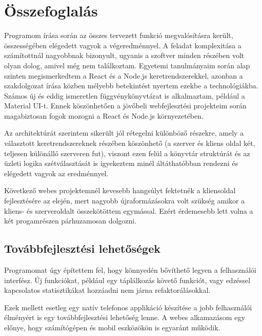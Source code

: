 \chapter{Összefoglalás}
\label{ch:osszefoglalas}

Programom írása során az összes tervezett funkció megvalósításra került, összességében elégedett vagyok a végeredménnyel. A feladat komplexitása a számítottnál nagyobbnak bizonyult, ugyanis a szoftver minden részében volt olyan dolog, amivel még nem találkoztam. Egyetemi tanulmányaim során alap szinten megismerkedtem a React és a Node.js keretrendszerekkel, azonban a szakdolgozat írása közben mélyebb betekintést nyertem ezekbe a technológiákba. Számos új és eddig ismeretlen függvénykönyvtárat is alkalmaztam, például a Material UI-t. Ennek köszönhetően a jövőbeli webfejlesztési projekteim során magabiztosan fogok mozogni a React és Node.js környezetében.



\bigskip

Az architektúrát szerintem sikerült jól rétegelni különböző részekre, amely a választott keretrendszereknek részében köszönhető (a szerver és kliens oldal két, teljesen különálló szerveren fut), viszont ezen felül a könyvtár struktúrát és az üzleti logika szétválasztását is igyekeztem minél áltáthatóbban rendezni és elégedett vagyok az eredménnyel.

\bigskip

Következő webes projektemnél kevesebb hangsúlyt fektetnék a kliensoldal fejlesztésére az elején, mert nagyobb újraformázásokra volt szükség amikor a kliens- és szerveroldalt összekötöttem egymással. Ezért érdemesebb lett volna a két progamrészen párhuzamosan dolgozni.

\pagebreak

\section{Továbbfejlesztési lehetőségek}

Programomat úgy építettem fel, hogy könnyedén bővíthető legyen a felhasználói interfész. Új funkciókat, például egy táplálkozás követő funkciót, vagy edzéssel kapcsolatos statisztikákat hozzáadni nem járna refaktorálásokkal.

\bigskip

Ezek mellett esetleg egy natív telefonos applikáció készítése a jobb felhasználói élményért is egy továbbfejlesztési lehetőség lenne. A webes alkamazásom egy előnye, hogy számítógépen és mobil eszközökön is egyaránt működik.

